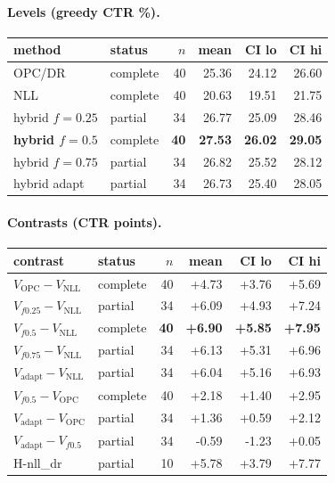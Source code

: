 \documentclass[10pt,a4paper]{article}
\begin{document}
\paragraph{Levels (greedy CTR \%).}
{\centering\small\begin{tabular}{llrrrr}
\toprule method & status & $n$ & mean & CI lo & CI hi \\
\midrule
OPC/DR & complete & 40 & 25.36 & 24.12 & 26.60 \\
NLL & complete & 40 & 20.63 & 19.51 & 21.75 \\
hybrid $f{=}0.25$ & partial & 34 & 26.77 & 25.09 & 28.46 \\
\textbf{hybrid $f{=}0.5$} & complete & \textbf{40} & \textbf{27.53} & \textbf{26.02} & \textbf{29.05} \\
hybrid $f{=}0.75$ & partial & 34 & 26.82 & 25.52 & 28.12 \\
hybrid adapt & partial & 34 & 26.73 & 25.40 & 28.05 \\
\bottomrule\end{tabular}\par}
\paragraph{Contrasts (CTR points).}
{\centering\small\begin{tabular}{llrrrr}
\toprule contrast & status & $n$ & mean & CI lo & CI hi \\
\midrule
$V_{\mathrm{OPC}}-V_{\mathrm{NLL}}$ & complete & 40 & +4.73 & +3.76 & +5.69 \\
$V_{f0.25}-V_{\mathrm{NLL}}$ & partial & 34 & +6.09 & +4.93 & +7.24 \\
\textbf{$V_{f0.5}-V_{\mathrm{NLL}}$} & complete & \textbf{40} & \textbf{+6.90} & \textbf{+5.85} & \textbf{+7.95} \\
$V_{f0.75}-V_{\mathrm{NLL}}$ & partial & 34 & +6.13 & +5.31 & +6.96 \\
$V_{\mathrm{adapt}}-V_{\mathrm{NLL}}$ & partial & 34 & +6.04 & +5.16 & +6.93 \\
$V_{f0.5}-V_{\mathrm{OPC}}$ & complete & 40 & +2.18 & +1.40 & +2.95 \\
$V_{\mathrm{adapt}}-V_{\mathrm{OPC}}$ & partial & 34 & +1.36 & +0.59 & +2.12 \\
$V_{\mathrm{adapt}}-V_{f0.5}$ & partial & 34 & -0.59 & -1.23 & +0.05 \\
H-nll\_dr & partial & 10 & +5.78 & +3.79 & +7.77 \\
\bottomrule\end{tabular}\par}
\end{document}
